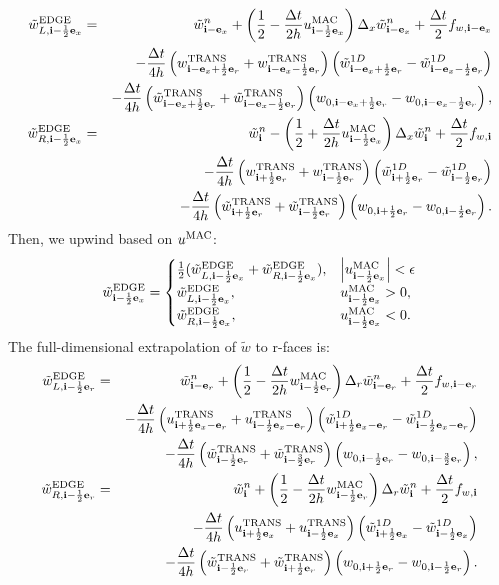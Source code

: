\documentclass[11pt]{article}
\def\half  {\frac{1}{2}}
\def\dt    {\Delta t}
\def\edge  {\rm EDGE}
\def\mac   {\rm MAC}
\def\trans {\rm TRANS}
\def\eb    {{\bf e}}
\def\ib    {{\bf i}}
\def\wt    {\tilde{w}}
\begin{document}
\begin{eqnarray}
\wt_{L,\ib-\half\eb_x}^{\edge} &=& \wt_{\ib-\eb_x}^n + \left(\half - \frac{\dt}{2h}u_{\ib-\half\eb_x}^{\mac}\right)\Delta_x \wt_{\ib-\eb_x}^n + \frac{\dt}{2}f_{w,\ib-\eb_x} \nonumber \\
&& - \frac{\dt}{4h}\left(w_{\ib-\eb_x+\half\eb_r}^{\trans}+w_{\ib-\eb_x-\half\eb_r}^{\trans}\right)\left(\wt_{\ib-\eb_x+\half\eb_r}^{1D} - \wt_{\ib-\eb_x-\half\eb_r}^{1D}\right) \nonumber \\
&& - \frac{\dt}{4h}\left(\wt_{\ib-\eb_x+\half\eb_r}^{\trans}+\wt_{\ib-\eb_x-\half\eb_r}^{\trans}\right)\left(w_{0,\ib-\eb_x+\half\eb_r}-w_{0,\ib-\eb_x-\half\eb_r}\right), \\
\wt_{R,\ib-\half\eb_x}^{\edge} &=& \wt_{\ib}^n - \left(\half + \frac{\dt}{2h}u_{\ib-\half\eb_x}^{\mac}\right)\Delta_x \wt_{\ib}^n + \frac{\dt}{2}f_{w,\ib} \nonumber \\
&& - \frac{\dt}{4h}\left(w_{\ib+\half\eb_r}^{\trans}+w_{\ib-\half\eb_r}^{\trans}\right)\left(\wt_{\ib+\half\eb_r}^{1D} - \wt_{\ib-\half\eb_r}^{1D}\right) \nonumber \\
&& - \frac{\dt}{4h}\left(\wt_{\ib+\half\eb_r}^{\trans}+\wt_{\ib-\half\eb_r}^{\trans}\right)\left(w_{0,\ib+\half\eb_r}-w_{0,\ib-\half\eb_r}\right).
\end{eqnarray}
Then, we upwind based on $u^{\mac}$:
\begin{equation}
\wt_{\ib-\half\eb_x}^{\edge} =
\begin{cases}
\half(\wt_{L,\ib-\half\eb_x}^{\edge} + \wt_{R,\ib-\half\eb_x}^{\edge}), & \left|u^{\mac}_{\ib-\half\eb_x}\right| < \epsilon \\
\wt_{L,\ib-\half\eb_x}^{\edge}, & u^{\mac}_{\ib-\half\eb_x} > 0, \\
\wt_{R,\ib-\half\eb_x}^{\edge}, & u^{\mac}_{\ib-\half\eb_x} < 0.
\end{cases}
\end{equation}
The full-dimensional extrapolation of $\wt$ to r-faces is:
\begin{eqnarray}
\wt_{L,\ib-\half\eb_r}^{\edge} &=& \wt_{\ib-\eb_r}^n + \left(\half - \frac{\dt}{2h}w_{\ib-\half\eb_r}^{\mac}\right)\Delta_r \wt_{\ib-\eb_r}^n + \frac{\dt}{2}f_{w,\ib-\eb_r} \nonumber \\
&& - \frac{\dt}{4h}\left(u_{\ib+\half\eb_x-\eb_r}^{\trans}+u_{\ib-\half\eb_x-\eb_r}^{\trans}\right)\left(\wt_{\ib+\half\eb_x-\eb_r}^{1D} - \wt_{\ib-\half\eb_x-\eb_r}^{1D}\right) \nonumber \\
&& -
\frac{\dt}{4h}\left(\wt_{\ib-\half\eb_r}^{\trans}+\wt_{\ib-\frac{3}{2}\eb_r}^{\trans}\right)\left(w_{0,\ib-\half\eb_r}-w_{0,\ib-\frac{3}{2}\eb_r}\right),\\
\wt_{R,\ib-\half\eb_r}^{\edge} &=& \wt_{\ib}^n + \left(\half - \frac{\dt}{2h}w_{\ib-\half\eb_r}^{\mac}\right)\Delta_r \wt_{\ib}^n + \frac{\dt}{2}f_{w,\ib} \nonumber \\
&& - \frac{\dt}{4h}\left(u_{\ib+\half\eb_x}^{\trans}+u_{\ib-\half\eb_x}^{\trans}\right)\left(\wt_{\ib+\half\eb_x}^{1D} - \wt_{\ib-\half\eb_x}^{1D}\right) \nonumber \\
&& -
\frac{\dt}{4h}\left(\wt_{\ib-\half\eb_r}^{\trans}+\wt_{\ib+\half\eb_r}^{\trans}\right)\left(w_{0,\ib+\half\eb_r}-w_{0,\ib-\half\eb_r}\right).
\end{eqnarray}
\end{document}
